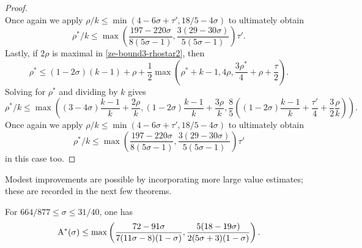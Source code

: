 \begin{proof}
\[\]
Once again we apply $\rho/k \le \min(4 - 6\sigma + \tau', 18/5 - 4\sigma)$ to ultimately obtain
\[
\rho^*/k \le \max\left(\frac{197 - 220\sigma}{8(5\sigma - 1)}, \frac{3(29 - 30\sigma)}{5(5\sigma - 1)}\right)\tau'.
\]
Lastly, if $2\rho$ is maximal in \eqref{ze-bound3-rhostar2}, then
\[
\rho^* \le (1 - 2\sigma)(k - 1) + \rho + \frac{1}{2}\max(\rho^*+k - 1, 4\rho, \frac{3\rho^*}{4} + \rho+\frac{\tau}{2}).
\]
Solving for $\rho^*$ and dividing by $k$ gives
\[
\rho^*/k \le \max((3 - 4\sigma)\frac{k - 1}{k} + \frac{2\rho}{k}, (1 - 2\sigma)\frac{k - 1}{k} + \frac{3\rho}{k}, \frac{8}{5}((1 - 2\sigma)\frac{k - 1}{k} + \frac{\tau'}{4} + \frac{3}{2}\frac{\rho}{k})).
\]
Once again we apply $\rho/k \le \min(4 - 6\sigma + \tau', 18/5 - 4\sigma)$ to ultimately obtain
\[
\rho^*/k \le \max\left(\frac{197 - 220\sigma}{8(5\sigma - 1)}, \frac{3(29 - 30\sigma)}{5(5\sigma - 1)}\right)\tau'
\]
in this case too.
\end{proof}

Modest improvements are possible by incorporating more large value estimates; these are recorded in the next few theorems.

\begin{theorem}\label{imp-energy-bound4}
For $664/877 \le \sigma \le 31/40$, one has
\[
\mathrm{A}^*(\sigma)\le \max\left(\frac{72 - 91\sigma}{7(11\sigma - 8)(1 - \sigma)}, \frac{5(18 - 19\sigma)}{2(5\sigma + 3)(1 - \sigma)}\right).
\]
\end{theorem}
\derived
{}

